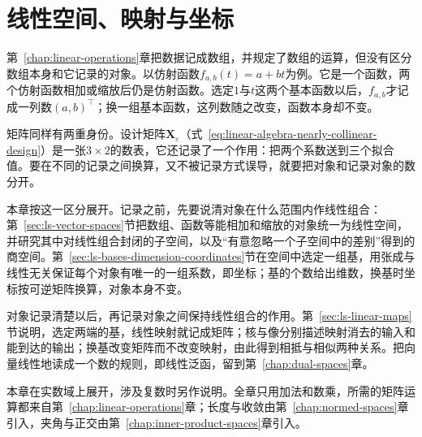 \chapter{线性空间、映射与坐标}
\label{chap:linear-representation}
\label{chap:linear-algebra-and-matrix-analysis}
\label{chap:linear-algebra}

第~\ref{chap:linear-operations}章把数据记成数组，并规定了数组的运算，但没有区分数组本身和它记录的对象。以仿射函数$f_{a,b}(t)=a+bt$为例。它是一个函数，两个仿射函数相加或缩放后仍是仿射函数。选定$1$与$t$这两个基本函数以后，$f_{a,b}$才记成一列数$(a,b)^{\top}$；换一组基本函数，这列数随之改变，函数本身却不变。

矩阵同样有两重身份。设计矩阵$\bm X_\varepsilon$（式~\eqref{eq:linear-algebra-nearly-collinear-design}）是一张$3\times2$的数表，它还记录了一个作用：把两个系数送到三个拟合值。要在不同的记录之间换算，又不被记录方式误导，就要把对象和记录对象的数分开。

本章按这一区分展开。记录之前，先要说清对象在什么范围内作线性组合：第~\ref{sec:ls-vector-spaces}节把数组、函数等能相加和缩放的对象统一为线性空间，并研究其中对线性组合封闭的子空间，以及“有意忽略一个子空间中的差别”得到的商空间。第~\ref{sec:ls-bases-dimension-coordinates}节在空间中选定一组基，用张成与线性无关保证每个对象有唯一的一组系数，即坐标；基的个数给出维数，换基时坐标按可逆矩阵换算，对象本身不变。

对象记录清楚以后，再记录对象之间保持线性组合的作用。第~\ref{sec:ls-linear-maps}节说明，选定两端的基，线性映射就记成矩阵；核与像分别描述映射消去的输入和能到达的输出；换基改变矩阵而不改变映射，由此得到相抵与相似两种关系。把向量线性地读成一个数的规则，即线性泛函，留到第~\ref{chap:dual-spaces}章。

本章在实数域上展开，涉及复数时另作说明。全章只用加法和数乘，所需的矩阵运算都来自第~\ref{chap:linear-operations}章；长度与收敛由第~\ref{chap:normed-spaces}章引入，夹角与正交由第~\ref{chap:inner-product-spaces}章引入。





